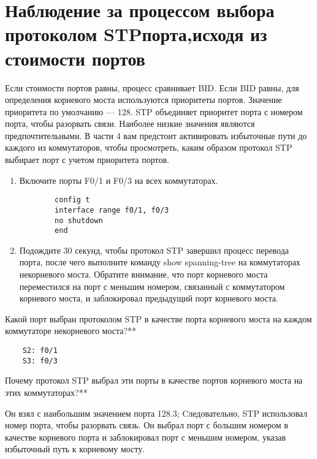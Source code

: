 \section{Наблюдение за процессом выбора протоколом STPпорта,исходя из стоимости портов}
Если стоимости портов равны, процесс сравнивает BID. Если BID равны, для определения корневого
моста используются приоритеты портов.
Значение приоритета по умолчанию — 128.
STP объединяет приоритет порта с номером порта, чтобы разорвать связи.
Наиболее низкие значения являются предпочтительными.
В части 4 вам предстоит активировать избыточные пути до каждого из коммутаторов, чтобы просмотреть, каким образом
протокол STP выбирает порт с учетом приоритета портов.

\begin{enumerate}[a]
    \item Включите порты F0/1 и F0/3 на всех коммутаторах.
    \begin{verbatim}
        config t
        interface range f0/1, f0/3
        no shutdown
        end
    \end{verbatim}

    \item Подождите 30 секунд, чтобы протокол STP завершил процесс перевода порта, после чего
    выполните команду show spanning-tree на коммутаторах некорневого моста.
    Обратите внимание, что порт корневого моста переместился на порт с меньшим номером, связанный с коммутатором
    корневого моста, и заблокировал предыдущий порт корневого моста.

\end{enumerate}

Какой порт выбран протоколом STP в качестве порта корневого моста на каждом коммутаторе некорневого моста?**
\begin{verbatim}
    S2: f0/1
    S3: f0/3
\end{verbatim}
Почему протокол STP выбрал эти порты в качестве портов корневого моста на этих коммутаторах?**

Он взял с наибольшим значением порта 128.3;
Cледовательно, STP использовал номер порта, чтобы разорвать связь.
Он выбрал порт с большим номером в качестве корневого порта
и заблокировал порт с меньшим номером,
указав избыточный путь к корневому мосту.
